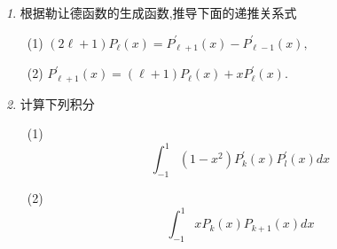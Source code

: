 \documentclass[11pt]{article}
\theoremstyle{remark}
\newtheorem{problem}{}
\begin{document}
\renewcommand{\labelenumi}{(\arabic{enumi})}
\renewcommand{\labelenumii}{(\arabic{enumi}.\arabic{enumii})}



\begin{problem}
根据勒让德函数的生成函数,推导下面的递推关系式
\begin{itemize}
  \item[(1)] $
  (2 \ell+1) P_\ell(x)=P_{\ell+1}^{\prime}(x)-P_{\ell-1}^{\prime}(x),
  $
  \item[(2)]
  $
  P_{\ell+1}^{\prime}(x)=(\ell+1) P_\ell(x)+x P_\ell^{\prime}(x).
  $
\end{itemize}

\end{problem}
  





\begin{problem}
计算下列积分
\begin{itemize}
  \item[(1)] $$
  \int_{-1}^1\left(1-x^2\right) P_k^{\prime}(x) P_l^{\prime}(x) d x
  $$
  \item[(2)]
  $$
\int_{-1}^1 x P_k(x) P_{k+1}(x) d x
$$
\end{itemize}
\end{problem}
\end{document}
